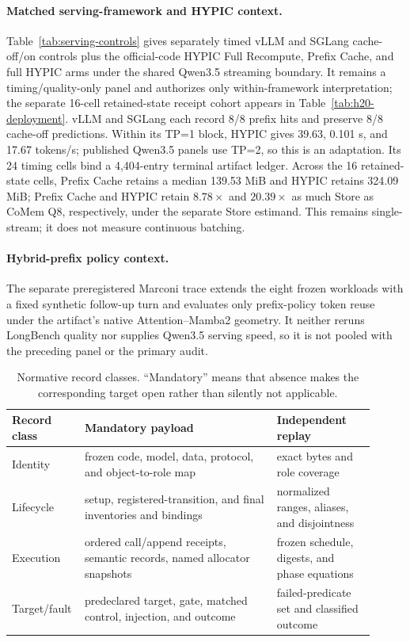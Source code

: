 \documentclass{article}
\begin{document}


\paragraph{Matched serving-framework and HYPIC context.}
Table~\ref{tab:serving-controls} gives separately timed vLLM and SGLang
cache-off/on controls plus the official-code HYPIC Full Recompute, Prefix
Cache, and full HYPIC arms under the shared Qwen3.5 streaming boundary.  It
remains a timing/quality-only panel and authorizes only within-framework
interpretation; the separate 16-cell retained-state receipt cohort appears in
Table~\ref{tab:h20-deployment}.
vLLM and SGLang each record 8/8 prefix hits and preserve 8/8 cache-off
predictions.  Within its TP=1 block, HYPIC gives 39.63, 0.101 s, and 17.67
tokens/s; published Qwen3.5 panels use TP=2, so this is an adaptation.  Its 24
timing cells bind a 4,404-entry terminal artifact ledger.  Across the
16 retained-state cells, Prefix Cache retains a median 139.53 MiB and HYPIC
retains 324.09 MiB; Prefix Cache and HYPIC retain $8.78\times$ and
$20.39\times$ as much Store as CoMem Q8, respectively, under the separate
Store estimand.  This remains single-stream; it does not measure continuous
batching.


\paragraph{Hybrid-prefix policy context.}
The separate preregistered Marconi trace extends the eight frozen workloads
with a fixed synthetic follow-up turn and evaluates only prefix-policy token
reuse under the artifact's native Attention--Mamba2 geometry.  It neither
reruns LongBench quality nor supplies Qwen3.5 serving speed, so it is not
pooled with the preceding panel or the primary audit.


\begin{table}[H]
  \caption{Normative record classes.  ``Mandatory'' means that absence makes
  the corresponding target open rather than silently not applicable.}
  \label{tab:normative-records}
  \centering\footnotesize
  \begin{tabular}{@{}p{0.14\linewidth}p{0.51\linewidth}p{0.26\linewidth}@{}}
    \toprule
    Record class & Mandatory payload & Independent replay \tabularnewline
    \midrule
    Identity & frozen code, model, data, protocol, and object-to-role map & exact bytes and role coverage \\
    Lifecycle & setup, registered-transition, and final inventories and bindings & normalized ranges, aliases, and disjointness \\
    Execution & ordered call/append receipts, semantic records, named allocator snapshots & frozen schedule, digests, and phase equations \\
    Target/fault & predeclared target, gate, matched control, injection, and outcome & failed-predicate set and classified outcome \\
    \bottomrule
  \end{tabular}
\end{table}
\end{document}
